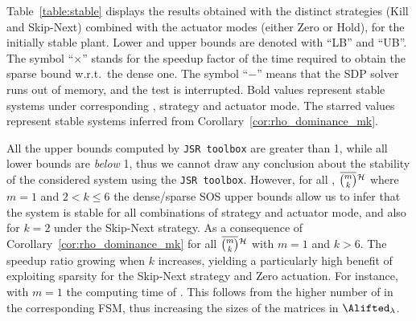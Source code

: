 Table~\ref{table:stable} displays the results obtained with the distinct strategies (Kill and Skip-Next) combined with the actuator modes (either Zero or Hold), for the initially stable plant.
Lower and upper bounds are denoted with ``LB'' and ``UB''.
The symbol ``$\times$'' stands for the speedup factor of the time required to obtain the sparse bound w.r.t.~the dense one.
The symbol ``$-$'' means that the SDP solver runs out of memory, and the test is interrupted.
Bold values represent stable systems under corresponding \ewhc{}, strategy and actuator mode.
The starred values represent stable systems inferred from Corollary~\ref{cor:rho_dominance_mk}.

All the upper bounds computed by \texttt{JSR toolbox} are greater than 1, while all lower bounds are \emph{below} 1, thus we cannot draw any conclusion about the stability of the considered system using the \texttt{JSR toolbox}.
However, for all \ewhc{}, $\overbar{\binom{m}{k}}^{\strat}$ where $m=1$ and $2<k\leq 6$ the dense/sparse SOS upper bounds allow us to infer that the system is stable for all combinations of strategy and actuator mode, and also for $k=2$ under the Skip-Next strategy.
As a consequence of  Corollary~\ref{cor:rho_dominance_mk}  for all $\overbar{\binom{m}{k}}^{\strat}$ with $m=1$ and $k>6$.
The speedup ratio  growing when $k$ increases, yielding a particularly high benefit of exploiting sparsity for the Skip-Next strategy and Zero actuation.
For instance, with $m=1$ the computing time of .
%
This follows from the higher number of  in the corresponding FSM, thus increasing the sizes of the matrices in $\Alifted_{\lambda}$. 
%
%

